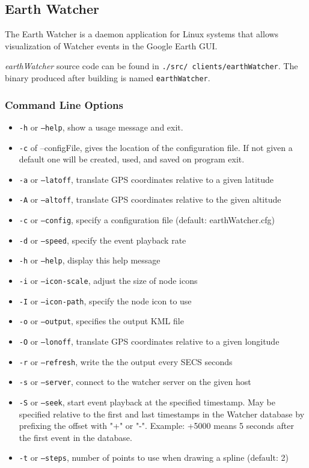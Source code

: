 \subsection{Earth Watcher}
\label{EarthWatcher}

The Earth Watcher is a daemon application for Linux systems that allows
visualization of Watcher events in the Google Earth GUI.

{\it earthWatcher} source code can be found in {\tt .\slash src\slash
clients\slash earthWatcher}. The binary produced after building is 
named {\tt earthWatcher}. 

\subsubsection{Command Line Options}
\begin{itemize}
\item {\tt -h} or {\tt --help}, show a usage message and exit. 
\item {\tt -c} of {--configFile}, gives the location of the configuration file. If not given a default one will be created, used, and saved on program exit.

\item {\tt -a} or {\tt --latoff}, translate GPS coordinates relative to a given latitude
\item {\tt -A} or {\tt --altoff}, translate GPS coordinates relative to the given altitude
\item {\tt -c} or {\tt --config}, specify a configuration file (default:
earthWatcher.cfg)
\item {\tt -d} or {\tt --speed}, specify the event playback rate
\item {\tt -h} or {\tt --help}, display this help message
\item {\tt -i} or {\tt --icon-scale}, adjust the size of node icons
\item {\tt -I} or {\tt --icon-path}, specify the node icon to use
\item {\tt -o} or {\tt --output}, specifies the output KML file
\item {\tt -O} or {\tt --lonoff}, translate GPS coordinates relative to a given longitude
\item {\tt -r} or {\tt --refresh}, write the the output every SECS seconds
\item {\tt -s} or {\tt --server}, connect to the watcher server on the given host
\item {\tt -S} or {\tt --seek}, start event playback at the specified timestamp.  May be specified relative to the first and last timestamps in the Watcher database by prefixing the offset with "+" or "-". Example: +5000 means 5 seconds after the first event in the database.
\item{\tt  -t} or {\tt --steps}, number of points to use when drawing a spline (default: 2)

\end{itemize}

